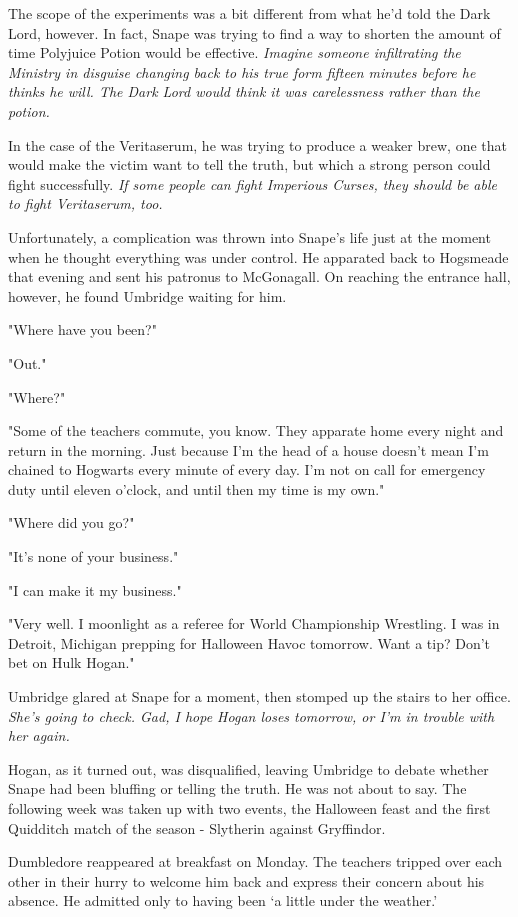 \documentclass[a4paper,11pt]{article}
\begin{document}
The scope of the experiments was a bit different from what he'd told the Dark Lord, however. In fact, Snape was trying to find a way to shorten the amount of time Polyjuice Potion would be effective. \emph{Imagine someone infiltrating the Ministry in disguise changing back to his true form fifteen minutes before he thinks he will. The Dark Lord would think it was carelessness rather than the potion.}

In the case of the Veritaserum, he was trying to produce a weaker brew, one that would make the victim want to tell the truth, but which a strong person could fight successfully. \emph{If some people can fight Imperious Curses, they should be able to fight Veritaserum, too.}

Unfortunately, a complication was thrown into Snape's life just at the moment when he thought everything was under control. He apparated back to Hogsmeade that evening and sent his patronus to McGonagall. On reaching the entrance hall, however, he found Umbridge waiting for him.

"Where have you been?"

"Out."

"Where?"

"Some of the teachers commute, you know. They apparate home every night and return in the morning. Just because I'm the head of a house doesn't mean I'm chained to Hogwarts every minute of every day. I'm not on call for emergency duty until eleven o'clock, and until then my time is my own."

"Where did you go?"

"It's none of your business."

"I can make it my business."

"Very well. I moonlight as a referee for World Championship Wrestling. I was in Detroit, Michigan prepping for Halloween Havoc tomorrow. Want a tip? Don't bet on Hulk Hogan."

Umbridge glared at Snape for a moment, then stomped up the stairs to her office. \emph{She's going to check. Gad, I hope Hogan loses tomorrow, or I'm in trouble with her again.}

Hogan, as it turned out, was disqualified, leaving Umbridge to debate whether Snape had been bluffing or telling the truth. He was not about to say. The following week was taken up with two events, the Halloween feast and the first Quidditch match of the season - Slytherin against Gryffindor.

Dumbledore reappeared at breakfast on Monday. The teachers tripped over each other in their hurry to welcome him back and express their concern about his absence. He admitted only to having been `a little under the weather.'
\end{document}
